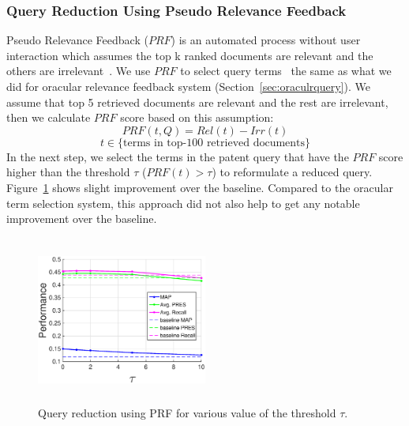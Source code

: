 \subsubsection{Query Reduction Using Pseudo Relevance Feedback}
Pseudo Relevance Feedback ($\mathit{PRF}$) is an automated process without user interaction which assumes the top k ranked documents are relevant and the others are irrelevant~\citep{Baeza-Yates2011}. We use $\mathit{PRF}$ to select query terms~\cite{maxwell2013compact} the same as what we did for oracular relevance feedback system (Section~\ref{sec:oraculrquery}). We assume that top 5 retrieved documents are relevant and the rest are irrelevant, then we calculate $\mathit{PRF}$ score based on this assumption:  
\begin{equation}
PRF(t,Q)=Rel(t)-Irr(t) 
 \label{eq:score}
\end{equation}
\vspace*{-2ex}
\begin{displaymath}t\in \lbrace \mbox{terms in top-100 retrieved documents}\rbrace\end{displaymath}
In the next step, we select the terms in the patent query that have the  $\mathit{PRF}$ score higher than the threshold $\tau$ ($PRF(t)>\tau$) to reformulate a reduced query. Figure~\ref{fig:prf} shows slight improvement over the baseline. Compared to the oracular term selection system, this approach did not also help to get any notable improvement over the baseline.
\begin{figure}[t!]
   \centering
   \includegraphics[width=0.50\textwidth,height=55mm]{figs/prf.eps}
   \caption{Query reduction using PRF for various value of the threshold $\tau$.}   
   \label{fig:prf} 
\end{figure}
